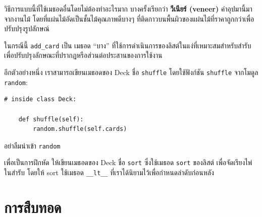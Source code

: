 วิธีการแบบนี้ที่ใช้เมธอดอื่นโดยไม่ต้องทำอะไรมาก บางครั้งเรียกว่า {\bf วีเนียร์ (veneer)} คำอุปมานี้มาจากงานไม้ 
โดยที่แผ่นไม้อัดเป็นชั้นไม้คุณภาพดีบางๆ ที่ติดกาวบนพื้นผิวของแผ่นไม้ที่ราคาถูกกว่าเพื่อปรับปรุงรูปลักษณ์



ในกรณีนี้ \verb"add_card" เป็น เมธอด ``บาง'' ที่ใช้การดำเนินการของลิสต์ในแง่ที่เหมาะสมสำหรับสำรับ เพื่อปรับปรุงลักษณะที่ปรากฏหรือส่วนต่อประสานของการใช้งาน

อีกตัวอย่างหนึ่ง เราสามารถเขียนเมธอดของ Deck ชื่อ {\tt shuffle} โดยใช้ฟังก์ชัน {\tt shuffle} จากโมดูล {\tt random}:


\begin{verbatim}
# inside class Deck:
            
    def shuffle(self):
        random.shuffle(self.cards)
\end{verbatim}
%
อย่าลืมนำเข้า {\tt random}


เพื่อเป็นการฝึกหัด ให้เขียนเมธอดของ Deck ชื่อ {\tt sort} ซึ่งใช้เมธอด {\tt sort} ของลิสต์ เพื่อจัดเรียงไพ่ในสำรับ  
โดยให้ sort ใช้เมธอด \verb"__lt__" ที่เราได้นิยามไว้เพื่อกำหนดลำดับก่อนหลัง
 



\section{การสืบทอด} %


